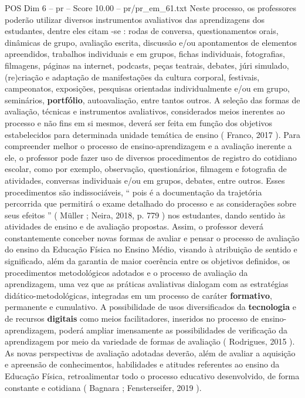 \begin{textsample}{POS Dim 6 – pr – Score 10.00 – pr/pr\_em\_61.txt}
Neste processo, os professores poderão utilizar diversos instrumentos avaliativos das aprendizagens dos estudantes, dentre eles citam -se : rodas de conversa, questionamentos orais, dinâmicas de grupo, avaliação escrita, discussão e/ou apontamentos de elementos apreendidos, trabalhos individuais e em grupos, fichas individuais, fotografias, filmagens, páginas na internet, podcasts, peças teatrais, debates, júri simulado, (re)criação e adaptação de manifestações da cultura corporal, festivais, campeonatos, exposições, pesquisas orientadas individualmente e/ou em grupo, seminários, \textbf{portfólio}, autoavaliação, entre tantos outros.
A seleção das formas de avaliação, técnicas e instrumentos avaliativos, considerados meios inerentes ao processo e não fins em si mesmos, deverá ser feita em função dos objetivos estabelecidos para determinada unidade temática de ensino ( Franco, 2017 ).
Para compreender melhor o processo de ensino-aprendizagem e a avaliação inerente a ele, o professor pode fazer uso de diversos procedimentos de registro do cotidiano escolar, como por exemplo, observação, questionários, filmagem e fotografia de atividades, conversas individuais e/ou em grupos, debates, entre outros.
Esses procedimentos são indissociáveis, “ pois é a documentação da trajetória percorrida que permitirá o exame detalhado do processo e as considerações sobre seus efeitos ” ( Müller ; Neira, 2018, p. 779 ) nos estudantes, dando sentido às atividades de ensino e de avaliação propostas.
Assim, o professor deverá constantemente conceber novas formas de avaliar e pensar o processo de avaliação do ensino da Educação Física no Ensino Médio, visando à atribuição de sentido e significado, além da garantia de maior coerência entre os objetivos definidos, os procedimentos metodológicos adotados e o processo de avaliação da aprendizagem, uma vez que as práticas avaliativas dialogam com as estratégias didático-metodológicas, integradas em um processo de caráter \textbf{formativo}, permanente e cumulativo.
A possibilidade de usos diversificados da \textbf{tecnologia} e de recursos \textbf{digitais} como meios facilitadores, inseridos no processo de ensino-aprendizagem, poderá ampliar imensamente as possibilidades de verificação da aprendizagem por meio da variedade de formas de avaliação ( Rodrigues, 2015 ).
As novas perspectivas de avaliação adotadas deverão, além de avaliar a aquisição e apreensão de conhecimentos, habilidades e atitudes referentes ao ensino da Educação Física, retroalimentar todo o processo educativo desenvolvido, de forma constante e cotidiana ( Bagnara ; Fensterseifer, 2019 ).

\end{textsample}
